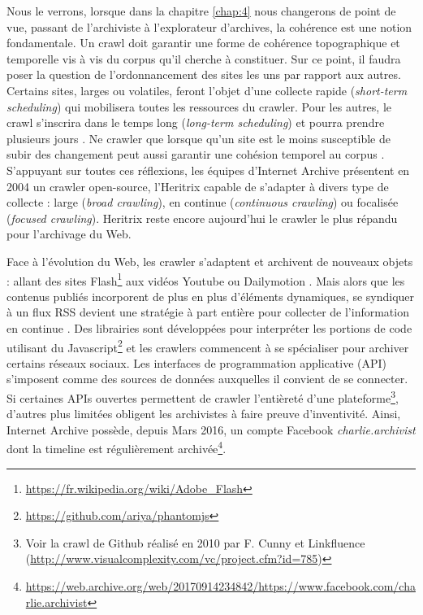 \documentclass[symmetric,justified,marginals=raggedouter]{tufte-book}
\begin{document}
Nous le verrons, lorsque dans la chapitre \ref{chap:4} nous changerons de point de vue, passant de l'archiviste à l'explorateur d'archives, la cohérence est une notion fondamentale. Un crawl doit garantir une forme de cohérence topographique et temporelle vis à vis du corpus qu'il cherche à constituer. Sur ce point, il faudra poser la question de l'ordonnancement des sites les uns par rapport aux autres. Certains sites, larges ou volatiles, feront l'objet d'une collecte rapide (\textit{short-term scheduling}) qui mobilisera toutes les ressources du crawler.  Pour les autres, le crawl s'inscrira dans le temps long (\textit{long-term scheduling}) et pourra prendre plusieurs jours \citep{castillo_scheduling_2004}. Ne crawler que lorsque qu'un site est le moins susceptible de subir des changement peut aussi garantir une cohésion temporel au corpus \citep{saad_coherence-oriented_2011}. S'appuyant sur toutes ces réflexions, les équipes d'Internet Archive présentent en 2004 un crawler open-source, l'Heritrix \citep{mohr_introduction_2004} capable de s'adapter à divers type de collecte : large (\textit{broad crawling}), en continue (\textit{continuous crawling}) ou focalisée (\textit{focused crawling}). Heritrix reste encore aujourd'hui le crawler le plus répandu pour l'archivage du Web. 

Face à l'évolution du Web, les crawler s'adaptent et archivent de nouveaux objets : allant des sites Flash\footnote{\url{https://fr.wikipedia.org/wiki/Adobe_Flash}} aux vidéos Youtube ou Dailymotion \citep{pop_archiving_2010}. Mais alors que les contenus publiés incorporent de plus en plus d'éléments dynamiques, se syndiquer à un flux RSS devient une stratégie à part entière pour collecter de l'information en continue \citep{oita_archiving_2010}. Des librairies sont développées pour interpréter les portions de code utilisant du Javascript\footnote{\url{https://github.com/ariya/phantomjs}} et les crawlers commencent à se spécialiser pour archiver certains réseaux sociaux. Les interfaces de programmation applicative (API) s'imposent comme des sources de données auxquelles il convient de se connecter. Si certaines APIs ouvertes permettent de crawler l'entièreté d'une plateforme\footnote{Voir la crawl de Github réalisé en 2010 par F. Cunny et Linkfluence (\url{http://www.visualcomplexity.com/vc/project.cfm?id=785})}, d'autres plus limitées obligent les archivistes à faire preuve d'inventivité. Ainsi, Internet Archive possède, depuis Mars 2016, un compte Facebook \textit{charlie.archivist} dont la timeline est régulièrement archivée\footnote{\url{https://web.archive.org/web/20170914234842/https://www.facebook.com/charlie.archivist}}. 
\end{document}
